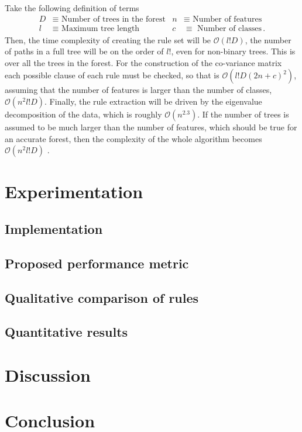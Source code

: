 \documentclass[11pt]{article}
\begin{document}
Take the following definition of terms
\begin{align*}
D & \equiv \text{ Number of trees in the forest} & n & \equiv \text{ Number of features} \\
l &\equiv \text{ Maximum tree length} & c &\equiv \text{ Number of classes} \, .
\end{align*}
Then, the time complexity of creating the rule set will be $\mathcal{O}(l! D)$, the number of paths in a full tree will be on the order of $l!$, even for non-binary trees. This is over all the trees in the forest. For the construction of the co-variance matrix each possible clause of each rule must be checked, so that is $\mathcal{O}(l!D(2n+c)^2)$, assuming that the number of features is larger than the number of classes, $\mathcal{O}(n^2l!D)$. Finally, the rule extraction will be driven by the eigenvalue decomposition of the data, which is roughly $\mathcal{O}(n^{2.3})$. If the number of trees is assumed to be much larger than the number of features, which should be true for an accurate forest, then the complexity of the whole algorithm becomes $\mathcal{O}(n^2 l! D)$ .
 
 
\section{Experimentation}
\label{sec:experiment}
\subsection{Implementation}
\subsection{Proposed performance metric}
\subsection{Qualitative comparison of rules}
\subsection{Quantitative results}



\section{Discussion}
\label{sec:dis}



\section{Conclusion}
\label{sec:conc}



\vskip 0.2in

\end{document}
